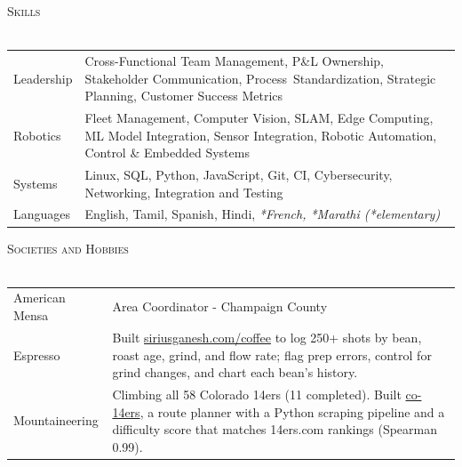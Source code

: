 \documentclass[letterpaper]{article}
\newcommand{\lineunder} {
    \vspace*{-8pt} \\
    \hspace*{-18pt} \hrulefill \\
}
\newcommand{\header} [1] {
    {\hspace*{-18pt}\vspace*{6pt} \fontsize{12pt}{14pt}\selectfont\textsc{#1}}
    \vspace*{-6pt} \lineunder
}
\begin{document}
\header{Skills}
\vspace{1mm}
\begin{tabular}{p{2.8cm}>{\raggedright\arraybackslash}p{14.3cm}}
    Leadership& Cross-Functional Team Management, P\&L Ownership, Stakeholder Communication, Process~Standardization, Strategic Planning, Customer Success Metrics\\
    Robotics& Fleet Management, Computer Vision, SLAM, Edge Computing, ML Model Integration, Sensor Integration, Robotic Automation, Control \& Embedded Systems\\
    Systems& Linux, SQL, Python, JavaScript, Git, CI, Cybersecurity, Networking, Integration and Testing\\
    Languages& English, Tamil, Spanish, Hindi, \textit{*French, *Marathi (*elementary)}\\
\end{tabular}
\vspace{2mm}

\header{Societies and Hobbies}
\vspace{1mm}
\begin{tabular}{p{2.8cm}>{\raggedright\arraybackslash}p{14.3cm}}
    American Mensa& Area Coordinator - Champaign County \\
    Espresso& Built \href{https://siriusganesh.com/coffee}{siriusganesh.com/coffee} to log 250+ shots by bean, roast age, grind, and flow rate; flag prep errors, control for grind changes, and chart each bean's history.\\
    Mountaineering& Climbing all 58 Colorado 14ers (11 completed). Built \href{https://siriusganesh.github.io/co-14ers/}{co-14ers}, a route planner with a Python scraping pipeline and a difficulty score that matches 14ers.com rankings (Spearman 0.99).\\
\end{tabular}
\vspace{-40mm}
\end{document}
